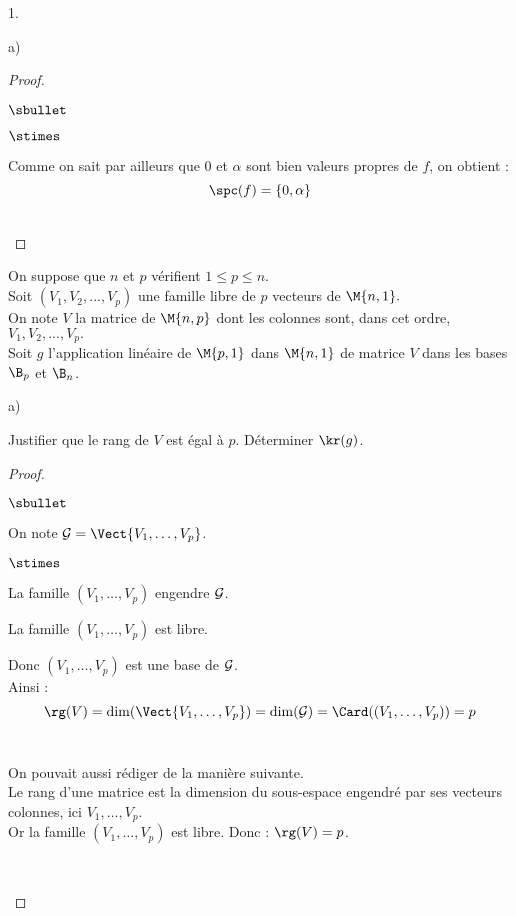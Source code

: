 \documentclass[11pt]{article}%
\begin{document}
\begin{noliste}{1.}
\begin{noliste}{a)}
\begin{proof}
\begin{remarkL}{0.95}
\begin{noliste}{$\sbullet$}
\begin{noliste}{$\stimes$}
      \item Comme on sait par ailleurs que $0$ et $\alpha$ sont 
      bien valeurs propres de $f$, on obtient :
      \[
        \spc(f) = \{0,\alpha\}
      \]
    \end{noliste}
    \end{noliste}
   \end{remarkL}~\\[-1.4cm]
  \end{proof}
 \end{noliste}
 
 
 
 
 \newpage
 
 
 
 
 \item On suppose que $n$ et $p$ vérifient $1 \leq p \leq n$.\\
 Soit $(V_1,V_2,...,V_p)$ une famille libre de $p$ vecteurs de 
 $\M{n,1}.$\\
 On note $V$ la matrice de $\M{n,p}$ dont les colonnes sont, dans cet 
 ordre, $V_1,V_2,...,V_p.$\\
 Soit $g$ l'application linéaire de $\M{p,1}$ dans $\M{n,1}$ de matrice 
 $V$ dans les bases $\B_p$ et $\B_n$.
 \begin{noliste}{a)}
  \setlength{\itemsep}{2mm}
  \item Justifier que le rang de $V$ est égal à $p$. Déterminer 
  $\kr(g)$.
  
  \begin{proof}~
   \begin{noliste}{$\sbullet$}
    \item On note ${\cal G} = \Vect{V_1, \ldots, V_p}$.
    \begin{noliste}{$\stimes$}
      \item La famille $(V_1, \ldots, V_p)$ engendre ${\cal G}$.
      \item La famille $(V_1, \ldots, V_p)$ est libre.
    \end{noliste} 
    
    Donc $(V_1, \ldots, V_p)$ est une base de ${\cal G}$.\\
    Ainsi : ~\\[-.6cm]
    \[
     \rg(V) = \dim(\Vect{V_1, \ldots , V_p}) = \dim({\cal G})
     = \Card((V_1, \ldots, V_p))= p
    \]
    ~\\[-1cm]
    
    \begin{remark}
      On pouvait aussi rédiger de la manière suivante.\\
      Le rang d'une matrice est la dimension du sous-espace
      engendré par ses vecteurs colonnes, ici $V_1, \ldots,
      V_p$.\\
      Or la famille $(V_1, \ldots, V_p)$ est libre. Donc :
      $\rg(V)=p$.
    \end{remark}~\\[-1.2cm]


\end{noliste}
\end{proof}
\end{noliste}
\end{noliste}
\end{document}
